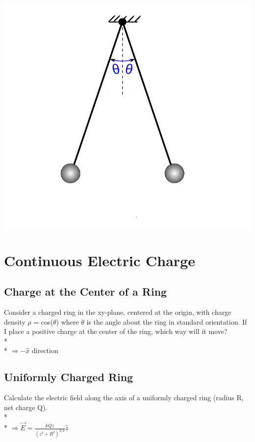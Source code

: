 \documentclass[11pt]{article}
\begin{document}
\begin{center}
\includegraphics[scale=0.25]{Images/pendulum.png}
\end{center}


\pagebreak
\section{Continuous Electric Charge}
\vspace{10pt}

\subsection{Charge at the Center of a Ring}
Consider a charged ring in the xy-plane, centered at the origin, with charge density $\rho$ = cos($\theta$) where $\theta$ is the angle about the ring in standard orientation.  If I place a positive charge at the center of the ring, which way will it move? \\* \\*
$\Rightarrow -\hat{x}$ direction

\subsection{Uniformly Charged Ring}
Calculate the electric field along the axis of a uniformly charged ring (radius R, net charge Q). \\* \\*
$\Rightarrow \vec{E} = \frac{kQz}{(z^2 + R^2)^{3/2}}\hat{z}$
\end{document}

